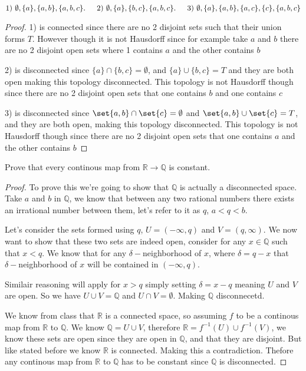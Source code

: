 \documentclass[12pt]{article}
\DeclarePairedDelimiter\set\{\}
\newcommand      {\Qm}         {{\mathbb Q}}
\newcommand      {\Rm}         {{\mathbb R}}
\begin{document}
$1)\ \emptyset,\{a\},\{a, b\},\{a, b, c\}. \\
\indent 2)\ \emptyset,\{a\},\{b, c\},\{a, b, c\}. \\
\indent 3)\ \emptyset,\{a\},\{a, b\},\{a, c\},\{c\},\{a, b, c\}$
\begin{proof}
    1) is connected since there are no 2 disjoint sets such that their union forms $T$. However though it is not Hausdorff since for example take $a$ and $b$ there are no 2 disjoint open sets where 1 contains $a$ and the other contains $b$

    2) is disconnected since $\{a\} \cap \{b,c\} = \emptyset$, and $\{a\}\cup\{b,c\} = T$ and they are both open making this topology disconnected. This topology is not Hausdorff though since there are no 2 disjoint open sets that one contains $b$ and one contains $c$

    3) is disconnected since $\set{a,b} \cap \set{c} = \emptyset$ and $\set{a,b} \cup \set{c} = T$, and they are both open, making this topology disconnected. This topology is not Hausdorff though since there are no 2 disjoint open sets that one contains $a$ and the other contains $b$

\end{proof}

 Prove that every continous map from $\Rm \to \Qm$ is constant. 

\begin{proof}
    To prove this we're going to show that $\Qm$ is actually a disconnected space. Take $a$ and $b$ in $\Qm$, we know that between any two rational numbers there exists an irrational number between them, let's refer to it as $q$, $a < q < b$. 
    
    Let's consider the sets formed using $q$, $U = (-\infty, q)$ and $V = (q, \infty)$. We now want to show that these two sets are indeed open, consider for any $x \in \Qm$ such that $x < q$. We know that for any $\delta-$neighborhood of $x$, where $\delta = q - x$ that $\delta-$neighborhood of $x$ will be contained in $(-\infty, q)$. 

    Similair reasoning will apply for $x > q$ simply setting $\delta = x - q$ meaning $U$ and $V$ are open. So we have $U \cup V = \Qm$ and $U \cap V = \emptyset$. Making $\Qm$ disconnecetd. 

    We know from class that $\Rm$ is a connected space, so assuming $f$ to be a continous map from $\Rm$ to $\Qm$. We know $\Qm = U \cup V$, therefore $\Rm = f^{-1}(U)\cup f^{-1}(V)$, we know these sets are open since they are open in $\Qm$, and that they are disjoint. But like stated before we know $\Rm$ is connected. Making this a contradiction. Thefore any continous map from $\Rm$ to $\Qm$ has to be constant since $\Qm$ is disconnected. 

    
\end{proof}
\end{document}
